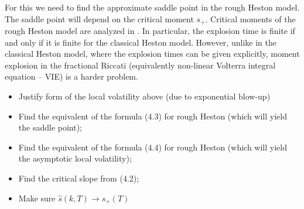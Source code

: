 \documentclass[12pt]{article}
\begin{document}
For this we need to find the approximate saddle point in the rough Heston model. The saddle point will depend on the critical moment $s_+$. Critical moments of the rough Heston model are analyzed in \cite{GGP18}. In particular, the explosion time is finite if and only if it is finite for the classical Heston model. However, unlike in the classical Heston model, where the explosion times can be given explicitly, moment explosion in the fractional Riccati (equivalently non-linear Volterra integral equation – VIE) is a harder problem.

\begin{itemize}
    \item Justify form of the local volatility above (due to exponential blow-up)
    \item Find the equivalent of the formula (4.3) for rough Heston (which will yield the saddle point);
    \item Find the equivalent of the formula (4.4) for rough Heston (which will yield the asymptotic local volatility);
    \item Find the critical slope from (4.2);
    \item Make sure $\hat { s } ( k , T ) \rightarrow s _ { + } ( T )$
\end{itemize}

\printbibliography
\end{document}
